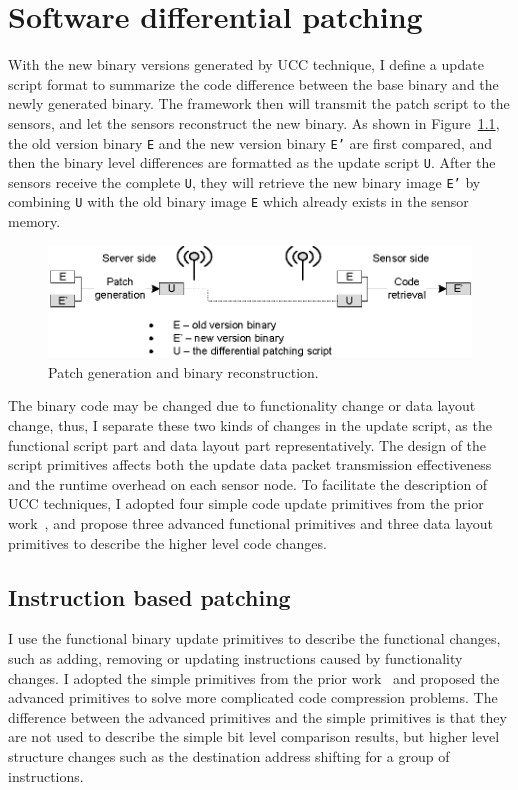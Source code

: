 \chapter{Software differential patching}
With the new binary versions generated by UCC technique, I define a update script format to summarize the code 
difference between the base binary and the newly generated binary. The framework then will transmit the patch script to 
the sensors, and let the sensors reconstruct the new binary. As shown in Figure~\ref{patch}, the old version binary 
\texttt{E} and the new version binary \texttt{E'} are first compared, and then the binary level differences are 
formatted as the update script \texttt{U}. After the sensors receive the complete \texttt{U}, they will retrieve the 
new binary image \texttt{E'} by combining \texttt{U} with the old binary image \texttt{E} which already exists in the 
sensor memory.

\begin{figure}[htbp]
\centering
\includegraphics[scale=1.2]{figures/patch.eps}
\caption{Patch generation and binary reconstruction.}
\label{patch}
\end{figure}


The binary code may be changed due to functionality change or data layout change, thus, I separate these two kinds of 
changes in the update script, as the functional script part and data layout part representatively.
The design of the script primitives affects both the update data packet transmission effectiveness and the runtime 
overhead on each sensor node. To facilitate the description of UCC techniques, I adopted four simple code update 
primitives from the prior work~\cite{related:script}, and propose three advanced functional primitives and three data 
layout primitives to describe the higher level code changes. 

\section {Instruction based patching}

I use the functional binary update primitives to describe the functional changes, such as adding, removing or updating 
instructions caused by functionality changes. 
I adopted the simple primitives from the prior work~\cite{related:script} and proposed the advanced primitives to solve 
more complicated code compression problems. The difference between the advanced primitives and the simple primitives is 
that they are not used to describe the simple bit level comparison results, but higher level structure changes such as 
the destination address shifting for a group of instructions.

